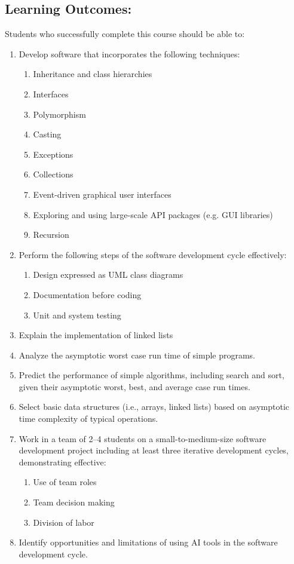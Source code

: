 \subsection*{Learning Outcomes:} 
Students who successfully complete this course should be able to:
\begin{enumerate}[label=\arabic*.,noitemsep,nolistsep]
\item Develop software that incorporates the following techniques:
    \begin{enumerate}[label={(\alph*)},noitemsep,nolistsep]
    \item Inheritance and class hierarchies
    \item Interfaces
    \item Polymorphism
    \item Casting
    \item Exceptions
    \item Collections
    \item Event-driven graphical user interfaces
    \item Exploring and using large-scale API packages (e.g. GUI libraries)
    \item Recursion
    \end{enumerate}
\item Perform the following steps of the software development cycle effectively:
    \begin{enumerate}[label={(\alph*)},noitemsep,nolistsep]
    \item Design expressed as UML class diagrams
    \item Documentation before coding
    \item Unit and system testing
    \end{enumerate}
\item Explain the implementation of linked lists
\item Analyze the asymptotic worst case run time of simple programs.
\item Predict the performance of simple algorithms, including search and sort, given their asymptotic worst, best, and average case run times.
\item Select basic data structures (i.e., arrays, linked lists) based on asymptotic time complexity of typical operations.
\item Work in a team of 2--4 students on a small-to-medium-size software development project including at least three iterative development cycles, demonstrating effective:
    \begin{enumerate}[label={(\alph*)},noitemsep,nolistsep]
    \item Use of team roles
    \item Team decision making
    \item Division of labor
    \end{enumerate}
\item Identify opportunities and limitations of using 
    AI tools in the software development cycle. 
\end{enumerate}

